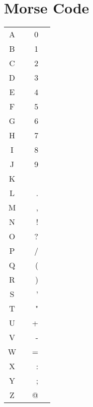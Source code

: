 \documentclass[11pt, onecolumn, table]{article}
\newcommand{\dit}{\texttt{\LARGE\raisebox{0.5ex}{.}}}
\newcommand{\dah}{\texttt{\LARGE\raisebox{-0.1ex}{-}}}
\begin{document}
\section{Morse Code}
\begin{center}
  \begin{tabular}{c l r l}
    A	&	\dit\dah			& 0	&	\dah\dah\dah\dah\dah	\\
    B	&	\dah\dit\dit\dit	& 1	&	\dit\dah\dah\dah\dah	\\
    C	&	\dah\dit\dah\dit	& 2	&	\dit\dit\dah\dah\dah	\\
    D	&	\dah\dit\dit		& 3	&	\dit\dit\dit\dah\dah	\\
    E	&	\dit				& 4	&	\dit\dit\dit\dit\dah	\\
    F	&	\dit\dit\dah\dit	& 5	&	\dit\dit\dit\dit\dit	\\
    G	&	\dah\dah\dit		& 6	&	\dah\dit\dit\dit\dit	\\
    H	&	\dit\dit\dit\dit	& 7	&	\dah\dah\dit\dit\dit	\\
    I	&	\dit\dit			& 8	&	\dah\dah\dah\dit\dit	\\
    J	&	\dit\dah\dah\dah	& 9	&	\dah\dah\dah\dah\dit	\\
    K	&	\dah\dit\dah		\\
    L	&	\dit\dah\dit\dit	& . &	\dit\dah\dit\dah\dit\dah	\\
    M	&	\dah\dah			& ,	&	\dah\dah\dit\dit\dah\dah	\\
    N	&	\dah\dit			& !	&	\dah\dit\dah\dit\dah\dah	\\
    O	&	\dah\dah\dah		& ? &	\dit\dit\dah\dah\dit\dit	\\
    P	&	\dit\dah\dah\dit	& /	&	\dah\dit\dit\dah\dit		\\
    Q	&	\dah\dah\dit\dah	& ( &	\dah\dit\dah\dah\dit		\\
    R	&	\dit\dah\dit		& ) &	\dah\dit\dah\dah\dit\dah	\\
    S	&	\dit\dit\dit		& '	&	\dit\dah\dah\dah\dah\dit	\\
    T	&	\dah				& " &	\dit\dah\dit\dit\dah\dit	\\
    U	&	\dit\dit\dah		& + &	\dit\dah\dit\dah\dit		\\
    V	&	\dit\dit\dit\dah	& - &	\dah\dit\dit\dit\dit\dah	\\
    W	&	\dit\dah\dah		& = &	\dah\dit\dit\dit\dah		\\
    X	&	\dah\dit\dit\dah	& : &	\dah\dah\dah\dit\dit\dit	\\
    Y	&	\dah\dit\dah\dah	& ; &	\dah\dit\dah\dit\dah\dit	\\
    Z	&	\dah\dah\dit\dit	& @ &	\dit\dah\dah\dit\dah\dit	\\
  \end{tabular}
\end{center}
\end{document}

